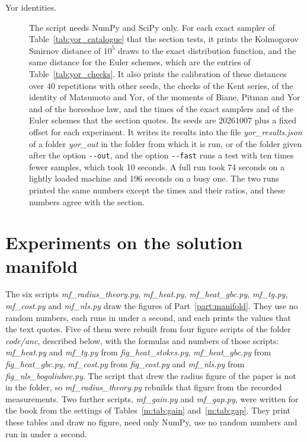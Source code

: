 \begin{description}
\item[Yor identities.] The script needs NumPy and SciPy only. For each exact sampler of Table~\ref{tab:yor_catalogue} that the section tests, it prints the Kolmogorov Smirnov distance of $10^5$ draws to the exact distribution function, and the same distance for the Euler schemes, which are the entries of Table~\ref{tab:yor_checks}. It also prints the calibration of these distances over $40$ repetitions with other seeds, the checks of the Kent series, of the identity of Matsumoto and Yor, of the moments of Biane, Pitman and Yor and of the horseshoe law, and the times of the exact samplers and of the Euler schemes that the section quotes. Its seeds are $20261007$ plus a fixed offset for each experiment. It writes its results into the file \textit{yor\_results.json} of a folder \textit{yor\_out} in the folder from which it is run, or of the folder given after the option \texttt{-{}-out}, and the option \texttt{-{}-fast} runs a test with ten times fewer samples, which took 10 seconds. A full run took 74 seconds on a lightly loaded machine and 196 seconds on a busy one. The two runs printed the same numbers except the times and their ratios, and these numbers agree with the section.
\end{description}

\section{Experiments on the solution manifold}
\label{sec:code_partiv}

The six scripts \textit{mf\_radius\_theory.py}, \textit{mf\_heat.py}, \textit{mf\_heat\_gbc.py}, \textit{mf\_tg.py}, \textit{mf\_cost.py} and \textit{mf\_nls.py} draw the figures of Part~\ref{part:manifold}. They use no random numbers, each runs in under a second, and each prints the values that the text quotes. Five of them were rebuilt from four figure scripts of the folder \textit{code/anc}, described below, with the formulas and numbers of those scripts: \textit{mf\_heat.py} and \textit{mf\_tg.py} from \textit{fig\_heat\_stokes.py}, \textit{mf\_heat\_gbc.py} from \textit{fig\_heat\_gbc.py}, \textit{mf\_cost.py} from \textit{fig\_cost.py} and \textit{mf\_nls.py} from \textit{fig\_nls\_bogoliubov.py}. The script that drew the radius figure of the paper is not in the folder, so \textit{mf\_radius\_theory.py} rebuilds that figure from the recorded measurements. Two further scripts, \textit{mf\_gain.py} and \textit{mf\_gap.py}, were written for the book from the settings of Tables~\ref{m:tab:gain} and~\ref{m:tab:gap}. They print these tables and draw no figure, need only NumPy, use no random numbers and run in under a second.

